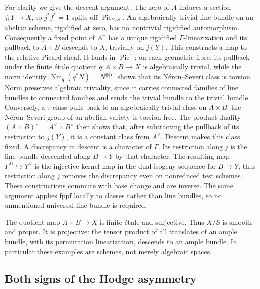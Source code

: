 For clarity we give the descent argument.  The zero of $A$ induces a
section $j:Y\to X$, so $j^*f^*=1$ splits off $\operatorname{Pic}_{Y/S}$.
An algebraically trivial line bundle on an abelian scheme, rigidified at
zero, has no nontrivial rigidified automorphism.  Consequently a fixed
point of $A^\vee$ has a unique rigidified $\Gamma$-linearization and its
pullback to $A\times B$ descends to $X$, trivially on $j(Y)$.  This
constructs a map to the relative Picard sheaf.  It lands in
$\operatorname{Pic}^{\tau}$: on each geometric fibre, its pullback
under the finite étale quotient $q:A\times B\to X$ is algebraically
trivial, while the norm identity
$\operatorname{Nm}_q(q^*N)=N^{\otimes|\Gamma|}$ shows that its
Néron--Severi class is torsion.  Norm preserves algebraic triviality,
since it carries connected families of line bundles to connected
families and sends the trivial bundle to the trivial bundle.
Conversely, a $\tau$-class pulls back to
an algebraically trivial class on $A\times B$: the Néron--Severi group of
an abelian variety is torsion-free.  The product duality
$(A\times B)^\vee=A^\vee\times B^\vee$ then shows that, after subtracting
the pullback of its restriction to $j(Y)$, it is a constant class from
$A^\vee$.  Descent makes this class fixed.  A discrepancy in descent is
a character of $\Gamma$.  Its restriction along $j$ is the line
bundle descended along $B\to Y$ by that character.  The resulting
map $\Gamma^D\hookrightarrow Y^\vee$ is the injective kernel map in
the dual isogeny sequence for $B\to Y$; thus restriction along $j$
removes the discrepancy even on nonreduced test schemes.  These
constructions commute with base change and
are inverse.  The same argument applies fppf locally to classes rather
than line bundles, so no unmentioned universal line bundle is required.

The quotient map $A\times B\to X$ is finite étale and surjective.  Thus
$X/S$ is smooth and proper.  It is projective: the tensor product of all
translates of an ample bundle, with its permutation linearization,
descends to an ample bundle.  In particular these examples are schemes,
not merely algebraic spaces.

\subsection{Both signs of the Hodge asymmetry}
